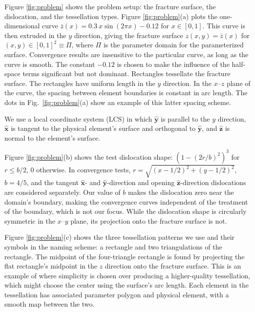 \documentclass[11pt]{article}
\newcommand{\uvec}[1]{\hat{\boldsymbol{#1}}}
\begin{document}
Figure \ref{fig:problem} shows the problem setup:
the fracture surface, the dislocation, and the tessellation types.
Figure \ref{fig:problem}(a) plots the one-dimensional curve
$\bar{z}(x) = 0.3 \ x \sin(2 \pi x) - 0.12$ for $x \in [0,1]$.
This curve is then extruded in the $y$ direction,
giving the fracture surface $z(x,y) = \bar{z}(x)$ for $(x,y) \in [0,1]^2 \equiv \Pi$,
where $\Pi$ is the parameter domain for the parameterized surface.
Convergence results are insensitive to the particular curve,
as long as the curve is smooth.
The constant $-0.12$ is chosen
to make the influence of the half-space terms significant but not dominant.
Rectangles tessellate the fracture surface.
The rectangles have uniform length in the $y$ direction.
In the $x$--$z$ plane of the curve, the spacing between element boundaries is constant in arc length.
The dots in Fig.~\ref{fig:problem}(a) show an example of this latter spacing scheme.

We use a local coordinate system (LCS) in which
$\uvec{y}$ is parallel to the $y$ direction,
$\uvec{x}$ is tangent to the physical element's surface and orthogonal to $\uvec{y}$,
and $\uvec{z}$ is normal to the element's surface.

Figure \ref{fig:problem}(b) shows the test dislocation shape:
$(1 - (2 r/b)^2)^3$ for $r \le b/2$, 0 otherwise.
In convergence tests,
$r = \sqrt{(x - 1/2)^2 + (y - 1/2)^2}$,
$b = 4/5$,
and the tangent $\uvec{x}$- and $\uvec{y}$-direction and opening $\uvec{z}$-direction
dislocations are considered separately.
Our value of $b$ makes the dislocation zero near the domain's boundary,
making the convergence curves independent of the treatment of the boundary,
which is not our focus.
While the dislocation shape is circularly symmetric in the $x$--$y$ plane,
its projection onto the fracture surface is not.

Figure \ref{fig:problem}(c) shows the three tessellation patterns we use
and their symbols in the naming scheme: a rectangle and two triangulations of the rectangle.
The midpoint of the four-triangle rectangle is found by
projecting the flat rectangle's midpoint in the $z$ direction onto the fracture surface.
This is an example of where simplicity is chosen over producing a higher-quality tessellation,
which might choose the center using the surface's arc length.
Each element in the tessellation has associated parameter polygon and physical element,
with a smooth map between the two.
\end{document}
